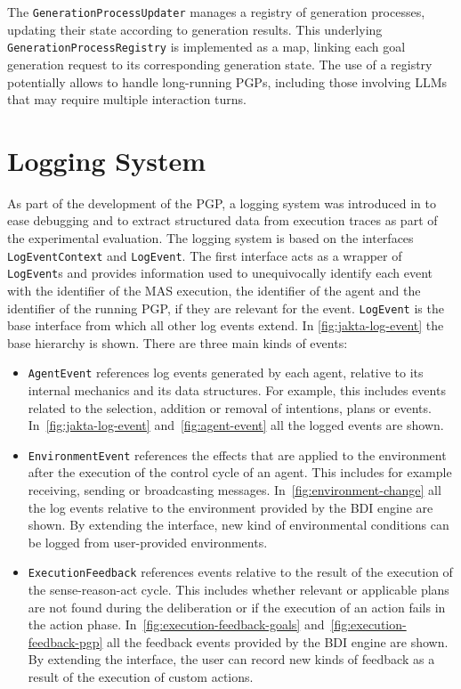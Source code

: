 \documentclass[12pt,a4paper,openright,twoside]{book}
\begin{document}
The \texttt{GenerationProcessUpdater} manages a registry of generation processes, updating their state according to generation results.
%
This underlying \\ \texttt{GenerationProcessRegistry} is implemented as a map, linking each goal generation request to its corresponding generation state.
%
The use of a registry potentially allows to handle long-running \acp{PGP}, including those involving \acp{LLM} that may require multiple interaction turns.

\section{Logging System}\label{sec:logging-system}

As part of the development of the \ac{PGP}, a logging system was introduced in \jakta{} to ease debugging and to extract structured data from execution traces as part of the experimental evaluation.
%
The logging system is based on the interfaces \texttt{LogEventContext} and \texttt{LogEvent}.
%
The first interface acts as a wrapper of \texttt{LogEvent}s and provides information used to unequivocally identify each event with the identifier of the \ac{MAS} execution, the identifier of the agent and the identifier of the running \ac{PGP}, if they are relevant for the event.
%
\texttt{LogEvent} is the base interface from which all other log events extend. In \cref{fig:jakta-log-event} the base hierarchy is shown. There are three main kinds of events:

\begin{itemize}
    \item \texttt{AgentEvent} references log events generated by each agent, relative to its internal mechanics and its data structures. 
    For example, this includes events related to the selection, addition or removal of intentions, plans or events. In~\cref{fig:jakta-log-event} and~\cref{fig:agent-event} all the logged events are shown.
    \item \texttt{EnvironmentEvent} references the effects that are applied to the environment after the execution of the control cycle of an agent.
    This includes for example receiving, sending or broadcasting messages. 
    In~\cref{fig:environment-change} all the log events relative to the environment provided by the BDI engine are shown. 
    By extending the interface, new kind of environmental conditions can be logged from user-provided environments.
    \item \texttt{ExecutionFeedback} references events relative to the result of the execution of the sense-reason-act cycle. 
    This includes whether relevant or applicable plans are not found during the deliberation or if the execution of an action fails in the action phase. 
    In~\cref{fig:execution-feedback-goals} and~\cref{fig:execution-feedback-pgp} all the feedback events provided by the BDI engine are shown. 
    By extending the interface, the user can record new kinds of feedback as a result of the execution of custom actions.
\end{itemize}
\end{document}

